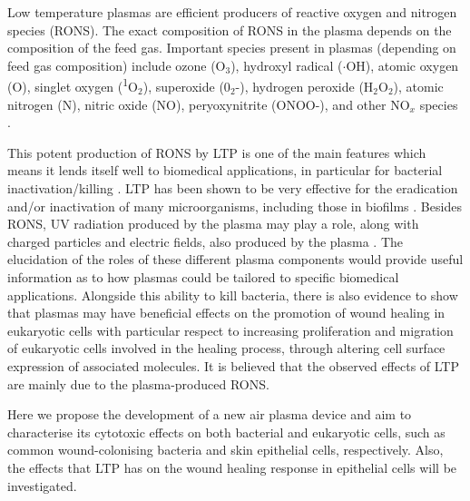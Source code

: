 \documentclass[11pt, oneside]{article}   	%
\begin{document}
Low temperature plasmas are efficient producers of reactive oxygen and nitrogen species (RONS). The exact composition of RONS in the plasma depends on the composition of the feed gas. Important species present in plasmas (depending on feed gas composition) include ozone (O$_3$), hydroxyl radical ($\cdot$OH), atomic oxygen (O), singlet oxygen (\textsuperscript{1}O$_2$), superoxide (0$_2$-), hydrogen peroxide (H$_2$O$_2$),  atomic nitrogen (N), nitric oxide (NO), peryoxynitrite (ONOO-), and other NO$_x$ species \cite{Graves2012the}. 

This potent production of RONS by LTP is one of the main features which means it lends itself well to biomedical applications, in particular for bacterial inactivation/killing \cite{Kong2009plasma}. LTP has been shown to be very effective for the eradication and/or inactivation of many microorganisms, including those in biofilms \cite{Laroussi2005low}. 
Besides RONS, UV radiation produced by the plasma may play a role, along with charged particles and electric fields, also produced by the plasma \cite{Mendis2000a, Laroussi2002nonthermal}. The elucidation of the roles of these different plasma components would provide useful information as to how plasmas could be tailored to specific biomedical applications. Alongside this ability to kill bacteria, there is also evidence to show that plasmas may have beneficial effects on the promotion of wound healing in eukaryotic cells \cite{Haertel2014nonthermal, Kramer2013suitability} with particular respect to increasing proliferation and migration of eukaryotic cells involved in the healing process, through altering cell surface expression of associated molecules. It is believed that the observed effects of LTP are mainly due to the plasma-produced RONS.


Here we propose the development of a new air plasma device and aim to characterise its cytotoxic effects on both bacterial and eukaryotic cells, such as common wound-colonising bacteria and skin epithelial cells, respectively. Also, the effects that LTP has on the wound healing response in epithelial cells will be investigated.
\end{document}
